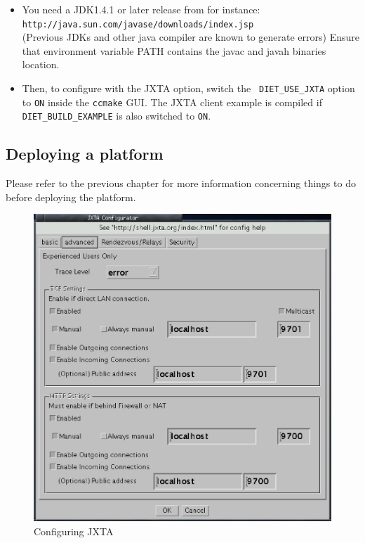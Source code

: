 \begin{itemize}
\item{You need a JDK1.4.1 or later release from for instance:\\
    \noindent
    {\footnotesize \texttt{http://java.sun.com/javase/downloads/index.jsp}
    }\\ (Previous JDKs and other java compiler are known to generate errors)
    Ensure that environment variable PATH contains the javac and javah binaries
    location.}
  
\item{Then, to configure \diet with the JXTA option, switch the {\tt
    DIET\_USE\_JXTA} option to {\tt ON} inside the {\tt ccmake} GUI. The JXTA
  client example is compiled if {\tt DIET\_BUILD\_EXAMPLE} is also switched to
  {\tt ON}.}

\end{itemize}

\subsection {Deploying a \dietj platform}
\label{ssec:deployjxta}



Please refer to the previous chapter for more information concerning things to
do before deploying the platform.

\begin{figure}[htb]
 \begin{center}
   \includegraphics[scale=0.6]{fig/JXTAConfig}
  \caption{Configuring JXTA \label{fig:platformjxta}}
 \end{center}
\end{figure}


